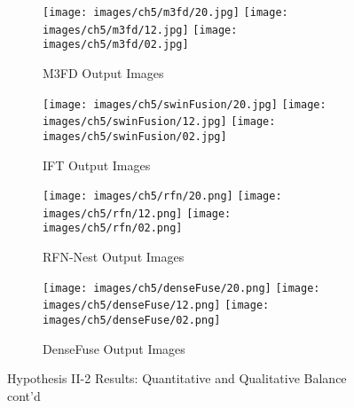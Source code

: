 \begin{figure}[htbp]
    \centering
    \begin{subfigure}[b]{\textwidth}
        \texttt{[image: images/ch5/m3fd/20.jpg]}
        \texttt{[image: images/ch5/m3fd/12.jpg]}
        \texttt{[image: images/ch5/m3fd/02.jpg]}
        \caption{M3FD\cite{liu2022target} Output Images}
        \label{fig:ch5:met5:m3fd}
    \end{subfigure}
    \vspace{0.01cm}
    \begin{subfigure}[b]{\textwidth}
        \texttt{[image: images/ch5/swinFusion/20.jpg]}
        \texttt{[image: images/ch5/swinFusion/12.jpg]}
        \texttt{[image: images/ch5/swinFusion/02.jpg]}
        \caption{IFT\cite{vs2022image} Output Images}
        \label{fig:ch5:met5:ift}
    \end{subfigure}
    \vspace{0.01cm}
    \begin{subfigure}[b]{\textwidth}
        \texttt{[image: images/ch5/rfn/20.png]}
        \texttt{[image: images/ch5/rfn/12.png]}
        \texttt{[image: images/ch5/rfn/02.png]}
        \caption{RFN-Nest\cite{li2021rfn} Output Images}
        \label{fig:ch5:met5:rfn}
    \end{subfigure}
    \vspace{0.01cm}
    \begin{subfigure}[b]{\textwidth}
        \texttt{[image: images/ch5/denseFuse/20.png]}
        \texttt{[image: images/ch5/denseFuse/12.png]}
        \texttt{[image: images/ch5/denseFuse/02.png]}
        \caption{DenseFuse\cite{li2019infrared} Output Images}
        \label{fig:ch5:met5:densefuse}
    \end{subfigure}
    \caption{Hypothesis II-2 Results: Quantitative and Qualitative Balance cont'd}
\end{figure}

